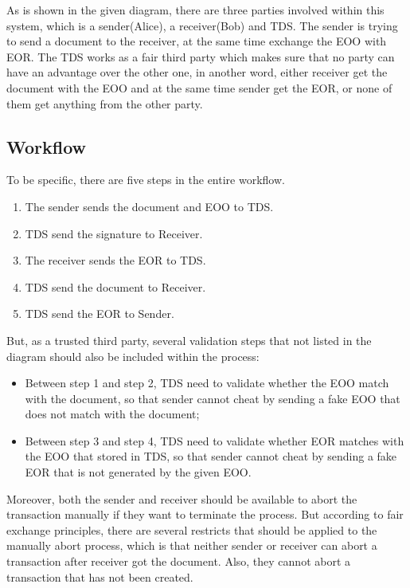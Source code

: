 \documentclass[runningheads]{llncs}
\begin{document}
As is shown in the given diagram, there are three parties involved within this system, which is a sender(Alice), a receiver(Bob) and TDS. The sender is trying to send a document to the receiver, at the same time exchange the EOO with EOR. The TDS works as a fair third party which makes sure that no party can have an advantage over the other one, in another word, either receiver get the document with the EOO and at the same time sender get the EOR, or none of them get anything from the other party. 

\subsection{Workflow}
To be specific, there are five steps in the entire workflow.

\begin{enumerate}
	\item The sender sends the document and EOO to TDS.
	\item TDS send the signature to Receiver.
	\item The receiver sends the EOR to TDS.
	\item TDS send the document to Receiver.
	\item TDS send the EOR to Sender.
\end{enumerate}

But, as a trusted third party, several validation steps that not listed in the diagram should also be included within the process:

\begin{itemize}
	\item Between step 1 and step 2, TDS need to validate whether the EOO match with the document, so that sender cannot cheat by sending a fake EOO that does not match with the document;
	\item Between step 3 and step 4, TDS need to validate whether EOR matches with the EOO that stored in TDS, so that sender cannot cheat by sending a fake EOR that is not generated by the given EOO.
\end{itemize}

Moreover, both the sender and receiver should be available to abort the transaction manually if they want to terminate the process. But according to fair exchange principles, there are several restricts that should be applied to the manually abort process, which is that neither sender or receiver can abort a transaction after receiver got the document. Also, they cannot abort a transaction that has not been created.
\end{document}

